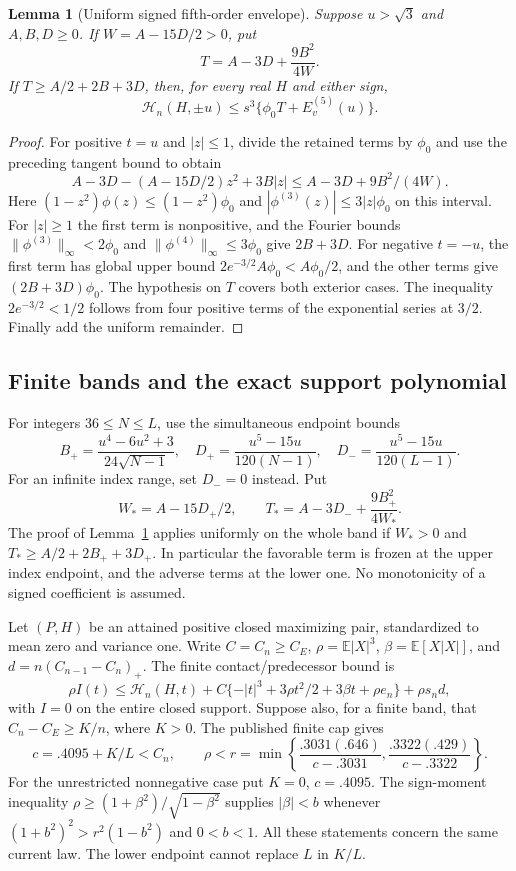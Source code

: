 \documentclass[11pt,a4paper]{article}
\numberwithin{equation}{section}
\newtheorem{lemma}[theorem]{Lemma}
\theoremstyle{definition}
\theoremstyle{remark}
\begin{document}
\begin{lemma}[Uniform signed fifth-order envelope]\label{cut49:support:envelope}
Suppose $u>\sqrt3$ and $A,B,D\ge0$. If
$W=A-15D/2>0$, put
\[
 T=A-3D+\frac{9B^2}{4W}.
\]
If $T\ge A/2+2B+3D$, then, for every real $H$ and either sign,
\[
 \mathcal H_n(H,\pm u)\le s^3\{\phi_0 T+E^{(5)}_v(u)\}.
\]
\end{lemma}
\begin{proof}
For positive $t=u$ and $|z|\le1$, divide the retained terms by
$\phi_0$ and use the preceding tangent bound to obtain
\[
 A-3D-(A-15D/2)z^2+3B|z|
 \le A-3D+9B^2/(4W).
\]
Here $(1-z^2)\phi(z)\le(1-z^2)\phi_0$ and
$|\phi^{(3)}(z)|\le3|z|\phi_0$ on this interval.
For $|z|\ge1$ the first term is nonpositive, and the Fourier bounds
$\|\phi^{(3)}\|_\infty<2\phi_0$ and
$\|\phi^{(4)}\|_\infty\le3\phi_0$ give $2B+3D$.
For negative $t=-u$, the first term has global upper bound
$2e^{-3/2}A\phi_0<A\phi_0/2$, and the other terms give
$(2B+3D)\phi_0$. The hypothesis on $T$ covers both exterior cases.
The inequality $2e^{-3/2}<1/2$ follows from four positive terms of
the exponential series at $3/2$. Finally add the uniform remainder.
\end{proof}

\subsection{Finite bands and the exact support polynomial}\label{cut49:support:polynomial}
For integers $36\le N\le L$, use the simultaneous endpoint bounds
\[
 B_+=\frac{u^4-6u^2+3}{24\sqrt{N-1}},\quad
 D_+=\frac{u^5-15u}{120(N-1)},\quad
 D_-=\frac{u^5-15u}{120(L-1)}.
\]
For an infinite index range, set $D_-=0$ instead. Put
\[
 W_*=A-15D_+/2,\qquad
 T_*=A-3D_-+\frac{9B_+^2}{4W_*}.
\]
The proof of Lemma~\ref{cut49:support:envelope} applies uniformly on the whole band
if $W_*>0$ and $T_*\ge A/2+2B_++3D_+$. In particular the favorable
term is frozen at the upper index endpoint, and the adverse terms at
the lower one. No monotonicity of a signed coefficient is assumed.

Let $(P,H)$ be an attained positive closed maximizing pair, standardized
to mean zero and variance one. Write $C=C_n\ge C_E$,
$\rho=\mathbb E|X|^3$, $\beta=\mathbb E[X|X|]$, and
$d=n(C_{n-1}-C_n)_+$. The finite contact/predecessor bound is
\[
 \rho I(t)\le\mathcal H_n(H,t)+
 C\{-|t|^3+3\rho t^2/2+3\beta t+\rho e_n\}+\rho s_nd,
\]
with $I=0$ on the entire closed support. Suppose also, for a finite
band, that $C_n-C_E\ge K/n$, where $K>0$. The published finite cap gives
\[
 c=.4095+K/L<C_n,\qquad
 \rho<r=\min\left\{\frac{.3031(.646)}{c-.3031},
                        \frac{.3322(.429)}{c-.3322}\right\}.
\]
For the unrestricted nonnegative case put $K=0$, $c=.4095$.
The sign-moment inequality
$\rho\ge(1+\beta^2)/\sqrt{1-\beta^2}$ supplies $|\beta|<b$ whenever
$(1+b^2)^2>r^2(1-b^2)$ and $0<b<1$. All these statements concern the
same current law. The lower endpoint cannot replace $L$ in $K/L$.
\end{document}
